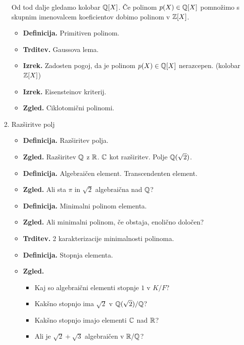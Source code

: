 \begin{enumerate}
    Od tod dalje gledamo kolobar \(\mathbb{Q}[X]\). Če polinom \(p(X) \in \mathbb{Q}[X]\) pomnožimo s skupnim imenovalcem koeficientov dobimo polinom v \(\mathbb{Z}[X]\).
    \begin{itemize}
        \item \textbf{Definicija.} Primitiven polinom.
        \item \textbf{Trditev.} Gaussova lema.
        \item \textbf{Izrek.} Zadosten pogoj, da je polinom \(p(X) \in \mathbb{Q}[X]\) nerazcepen. (kolobar \(\mathbb{Z}[X]\))
        \item \textbf{Izrek.} Eisensteinov kriterij.
        \item \textbf{Zgled.} Ciklotomični polinomi.
    \end{itemize}

    \item Razširitve polj
    \begin{itemize}
        \item \textbf{Definicija.} Razširitev polja.
        \item \textbf{Zgled.} Razširitev \(\mathbb{Q}\) z \(\mathbb{R}\). \(\mathbb{C}\) kot razširitev. Polje \(\mathbb{Q}(\sqrt{2})\).
        \item \textbf{Definicija.} Algebraičen element. Transcendenten element.
        \item \textbf{Zgled.} Ali sta \(\pi\) in \(\sqrt{2}\) algebraična nad \(\mathbb{Q}\)?
        \item \textbf{Definicija.} Minimalni polinom elementa.
        \item \textbf{Zgled.} Ali minimalni polinom, če obstaja, enolično določen?
        \item \textbf{Trditev.} 2 karakterizacije minimalnosti polinoma.
        \item \textbf{Definicija.} Stopnja elementa.
        \item \textbf{Zgled.} \
        \begin{itemize}
            \item Kaj so algebraični elementi stopnje \(1\) v \(K/F\)?
            \item Kakšno stopnjo ima \(\sqrt{2}\) v \(\mathbb{Q}(\sqrt{2})/\mathbb{Q}\)?
            \item Kakšno stopnjo imajo elementi \(\mathbb{C}\) nad \(\mathbb{R}\)?
            \item Ali je \(\sqrt{2} + \sqrt{3}\) algebraičen v \(\mathbb{R}/\mathbb{Q}\)?
        \end{itemize}
    \end{itemize}


\end{enumerate}
